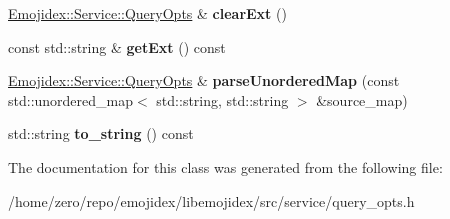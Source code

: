 \begin{DoxyCompactItemize}
\item 
\hyperlink{classEmojidex_1_1Service_1_1QueryOpts}{Emojidex\+::\+Service\+::\+Query\+Opts} \& {\bfseries clear\+Ext} ()\hypertarget{classEmojidex_1_1Service_1_1QueryOpts_ae0455c295169a616efbbd5b3721c998f}{}\label{classEmojidex_1_1Service_1_1QueryOpts_ae0455c295169a616efbbd5b3721c998f}

\item 
const std\+::string \& {\bfseries get\+Ext} () const \hypertarget{classEmojidex_1_1Service_1_1QueryOpts_ae1904d52159992a8bc6b50eefe2f27c6}{}\label{classEmojidex_1_1Service_1_1QueryOpts_ae1904d52159992a8bc6b50eefe2f27c6}

\item 
\hyperlink{classEmojidex_1_1Service_1_1QueryOpts}{Emojidex\+::\+Service\+::\+Query\+Opts} \& {\bfseries parse\+Unordered\+Map} (const std\+::unordered\+\_\+map$<$ std\+::string, std\+::string $>$ \&source\+\_\+map)\hypertarget{classEmojidex_1_1Service_1_1QueryOpts_afeace74ce515ca48c21c01fae5c01838}{}\label{classEmojidex_1_1Service_1_1QueryOpts_afeace74ce515ca48c21c01fae5c01838}

\item 
std\+::string {\bfseries to\+\_\+string} () const \hypertarget{classEmojidex_1_1Service_1_1QueryOpts_a8a513409a7f1c5509bd393bb2bd28225}{}\label{classEmojidex_1_1Service_1_1QueryOpts_a8a513409a7f1c5509bd393bb2bd28225}

\end{DoxyCompactItemize}


The documentation for this class was generated from the following file\+:\begin{DoxyCompactItemize}
\item 
/home/zero/repo/emojidex/libemojidex/src/service/query\+\_\+opts.\+h\end{DoxyCompactItemize}
